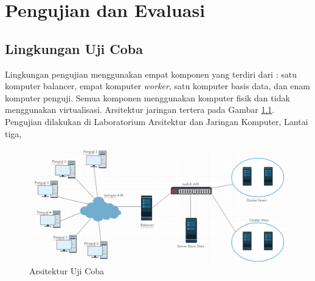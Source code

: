 \documentclass{ta-its}
\begin{document}
	\chapter{Pengujian dan Evaluasi}
		\section{Lingkungan Uji Coba}
			Lingkungan pengujian menggunakan empat komponen yang terdiri dari : satu komputer balancer, empat komputer \textit{worker}, satu komputer basis data, dan enam komputer penguji. Semua komponen menggunakan komputer fisik dan tidak menggunakan virtualisasi. Arsitektur jaringan tertera pada Gambar \ref{gambarArsitekturUjiCoba}. Pengujian dilakukan di Laboratorium Arsitektur dan Jaringan Komputer, Lantai tiga, 
			
			\begin{figure}[h] %
				\centering
				\includegraphics[width=\linewidth]{contoh_img/arsitekturujicoba}
				\caption{Arsitektur Uji Coba}
				\label{gambarArsitekturUjiCoba}
			\end{figure}
			
\end{document}
